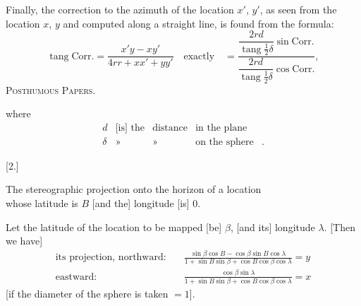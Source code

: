 Finally, the correction to the azimuth of the location $x'$, $y'$, as seen from the location $x$, $y$ and computed along a straight line, is found from the formula:
\[
\operatorname{tang}\mathrm{Corr.}=\frac{x'y-xy'}{4rr+xx'+yy'}\quad\text{exactly}\quad=\frac{\dfrac{2rd}{\operatorname{tang}\frac12\delta}\sin\mathrm{Corr.}}{\dfrac{2rd}{\operatorname{tang}\frac12\delta}\cos\mathrm{Corr.}},
\]
\clearpage
{}\hfill\textsc{Posthumous Papers.}\hfill\mbox{}\par\medskip
where
\[
\begin{array}{rcccl}
d&\text{[is] the}&\text{distance}&\text{in the plane}&\\
\delta&\text{»}&\text{»}&\text{on the sphere}&\text{.}
\end{array}
\]
\bigskip
\begin{center}
[2.]\par\medskip
The stereographic projection onto the horizon of a location\\whose latitude is $B$ [and the] longitude [is] $0$.
\end{center}
Let the latitude of the location to be mapped [be] $\beta$, [and its] longitude $\lambda$. [Then we have]
\[
\begin{aligned}
\text{its projection, northward:}\quad&\frac{\sin\beta\cos B-\cos\beta\sin B\cos\lambda}{1+\sin B\sin\beta+\cos B\cos\beta\cos\lambda}=y\\[6pt]
\text{eastward:}\quad&\frac{\cos\beta\sin\lambda}{1+\sin B\sin\beta+\cos B\cos\beta\cos\lambda}=x
\end{aligned}
\]
[if the diameter of the sphere is taken $=1$].

